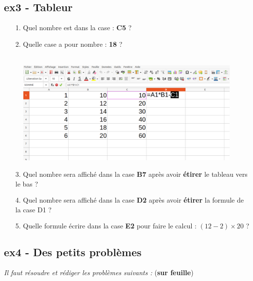 \documentclass[11pt]{article}
\begin{document}
\begin{minipage}[t]{0.45\textwidth}
  \subsection*{ex3 - Tableur}

  \begin{enumerate}
    \item[1.] Quel nombre est dans la case : \textbf{C5} ? \dotfill
    \item[2.] Quelle case a pour nombre : \textbf{18} ? \dotfill
  \end{enumerate}

\end{minipage}
\begin{minipage}[t]{0.5\textwidth}

  \begin{figure}[H]
        \centering
        \includegraphics[width=\linewidth]{4x2-proportionnalite/ie-tableur.png}
  \end{figure}

\end{minipage}

\begin{enumerate}
  \item[3.] Quel nombre sera affiché dans la case \textbf{B7} après avoir \textbf{étirer} le tableau vers le bas ? \dotfill
  \item[4.] Quel nombre sera affiché dans la case \textbf{D2} après avoir \textbf{étirer} la formule de la case D1 ? \dotfill
  \item[5.] Quelle formule écrire dans la case \textbf{E2} pour faire le calcul : $(12-2) \times 20$ ? \dotfill
\end{enumerate}

\newpage

\subsection*{ex4 - Des petits problèmes}
\textit{Il faut résoudre et rédiger les problèmes suivants :} (\textbf{sur feuille})
\end{document}
